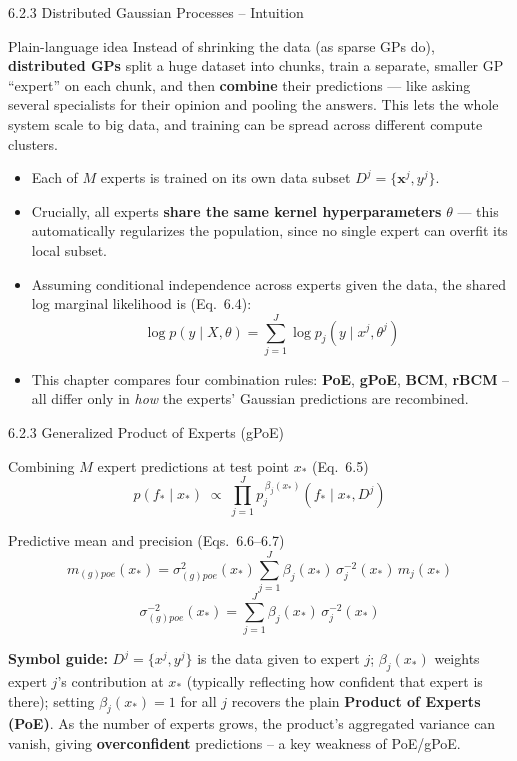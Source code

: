\documentclass[aspectratio=169,10pt]{beamer}
\newcommand{\x}{\mathbf{x}}
\begin{document}
\begin{frame}{6.2.3 Distributed Gaussian Processes -- Intuition}
  \begin{block}{Plain-language idea}
    Instead of shrinking the data (as sparse GPs do), \textbf{distributed
    GPs} split a huge dataset into chunks, train a separate, smaller GP
    ``expert'' on each chunk, and then \textbf{combine} their predictions ---
    like asking several specialists for their opinion and pooling the
    answers. This lets the whole system scale to big data, and training can
    be spread across different compute clusters.
  \end{block}
  \begin{itemize}
    \item Each of $M$ experts is trained on its own data subset
          $D^j = \{\x^j, y^j\}$.
    \item Crucially, all experts \textbf{share the same kernel
          hyperparameters} $\theta$ --- this automatically regularizes the
          population, since no single expert can overfit its local subset.
    \item Assuming conditional independence across experts given the data,
          the shared log marginal likelihood is (Eq.\ 6.4):
          \[
            \log p(y\mid X,\theta) = \sum_{j=1}^{J} \log p_j(y\mid x^j,\theta^j)
          \]
    \item This chapter compares four combination rules: \textbf{PoE},
          \textbf{gPoE}, \textbf{BCM}, \textbf{rBCM} -- all differ only in
          \emph{how} the experts' Gaussian predictions are recombined.
  \end{itemize}
\end{frame}

\begin{frame}{6.2.3 Generalized Product of Experts (gPoE)}
  \begin{block}{Combining $M$ expert predictions at test point $x_*$ (Eq.\ 6.5)}
    \[
      p(f_* \mid x_*) \;\propto\; \prod_{j=1}^{J} p_j^{\,\beta_j(x_*)}(f_*\mid x_*, D^j)
    \]
  \end{block}
  \begin{block}{Predictive mean and precision (Eqs.\ 6.6--6.7)}
    \[
      m_{(g)poe}(x_*) = \sigma^2_{(g)poe}(x_*)\sum_{j=1}^{J}\beta_j(x_*)\,\sigma_j^{-2}(x_*)\,m_j(x_*)
    \]
    \[
      \sigma^{-2}_{(g)poe}(x_*) = \sum_{j=1}^{J}\beta_j(x_*)\,\sigma_j^{-2}(x_*)
    \]
  \end{block}
  \textbf{Symbol guide:} $D^j = \{x^j, y^j\}$ is the data given to expert
  $j$; $\beta_j(x_*)$ weights expert $j$'s contribution at $x_*$ (typically
  reflecting how confident that expert is there); setting $\beta_j(x_*)=1$
  for all $j$ recovers the plain \textbf{Product of Experts (PoE)}. As the
  number of experts grows, the product's aggregated variance can vanish,
  giving \textbf{overconfident} predictions -- a key weakness of PoE/gPoE.
\end{frame}
\end{document}
